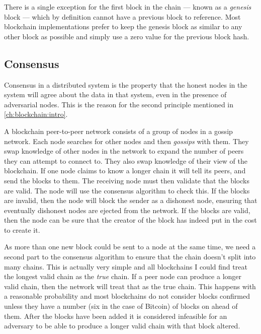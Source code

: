 There is a single exception for the first block in the chain --- known as a \emph{genesis} block --- which by definition cannot have a previous block to reference. Most blockchain implementations prefer to keep the genesis block as similar to any other block as possible and simply use a zero value for the previous block hash.


\subsection{Consensus}
\label{ch:blockchain:structure:consensus}

Consensus in a distributed system is the property that the honest nodes in the system will agree about the data in that system, even in the presence of adversarial nodes. This is the reason for the second principle mentioned in \autoref{ch:blockchain:intro}.

A blockchain peer-to-peer network consists of a group of nodes in a gossip network. Each node searches for other nodes and then \emph{gossips} with them. They swap knowledge of other nodes in the network to expand the number of peers they can attempt to connect to. They also swap knowledge of their view of the blockchain. If one node claims to know a longer chain it will tell its peers, and send the blocks to them. The receiving node must then validate that the blocks are valid. The node will use the consensus algorithm to check this. If the blocks are invalid, then the node will block the sender as a dishonest node, ensuring that eventually dishonest nodes are ejected from the network. If the blocks are valid, then the node can be sure that the creator of the block has indeed put in the cost to create it.

As more than one new block could be sent to a node at the same time, we need a second part to the consensus algorithm to ensure that the chain doesn't split into many chains. This is actually very simple and all blockchains I could find treat the longest valid chain as the \emph{true} chain. If a peer node can produce a longer valid chain, then the network will treat that as the true chain. This happens with a reasonable probability and most blockchains do not consider blocks confirmed unless they have a number (six in the case of Bitcoin) of blocks on ahead of them. After the blocks have been added it is considered infeasible for an adversary to be able to produce a longer valid chain with that block altered.

